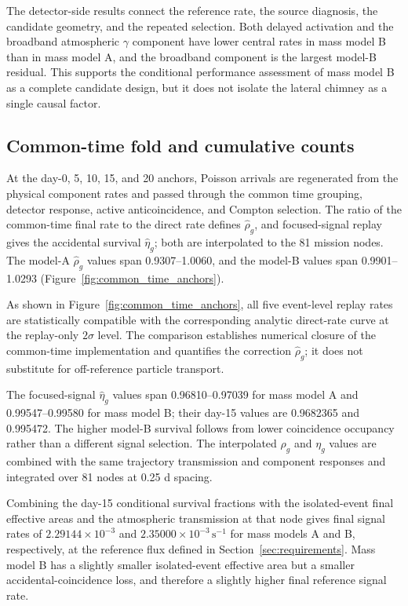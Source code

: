 \documentclass[11pt]{article}
\newcommand{\revblue}[1]{\textcolor{revisionblue}{#1}}
\newcommand{\cps}{\ensuremath{\,\mathrm{s^{-1}}}}
\begin{document}
The detector-side results connect the reference rate, the source diagnosis, the
candidate geometry, and the repeated selection. Both delayed activation and
the broadband atmospheric $\gamma$ component have lower central rates in mass
model B than in mass model A, and the broadband component is the largest
model-B residual. This supports the conditional performance assessment of mass
model B as a complete candidate design, but it does not isolate the lateral
chimney as a single causal factor.

\FloatBarrier

\subsection{Common-time fold and cumulative counts}
\label{subsec:mission_fold_validation}

At the day-0, 5, 10, 15, and 20 anchors, Poisson arrivals are regenerated from the physical component rates and passed through the common time grouping, detector response, active anticoincidence, and Compton selection. The ratio of the common-time final rate to the direct rate defines $\widehat\rho_g$, and focused-signal replay gives the accidental survival $\widehat\eta_g$; both are interpolated to the 81 mission nodes. The model-A $\widehat\rho_g$ values span 0.9307--1.0060, and the model-B values span 0.9901--1.0293 (Figure~\ref{fig:common_time_anchors}).

As shown in Figure~\ref{fig:common_time_anchors}, all five event-level replay
rates are statistically compatible with the corresponding analytic direct-rate
curve at the replay-only $2\sigma$ level. The comparison establishes numerical
closure of the common-time implementation and quantifies the correction
$\widehat\rho_g$; it does not substitute for off-reference particle transport.

The focused-signal $\widehat\eta_g$ values span 0.96810--0.97039 for mass model A and 0.99547--0.99580 for mass model B; their day-15 values are 0.9682365 and 0.995472. The higher model-B survival follows from lower coincidence occupancy rather than a different signal selection. The interpolated $\rho_g$ and $\eta_g$ values are combined with the same trajectory transmission and component responses and integrated over 81 nodes at 0.25 d spacing.

\revblue{Combining the day-15 conditional survival fractions with the isolated-event final effective areas and the atmospheric transmission at that node gives final signal rates of $2.29144\times10^{-3}$ and $2.35000\times10^{-3}\cps$ for mass models A and B, respectively, at the reference flux defined in Section~\ref{sec:requirements}. Mass model B has a slightly smaller isolated-event effective area but a smaller accidental-coincidence loss, and therefore a slightly higher final reference signal rate.}
\end{document}
